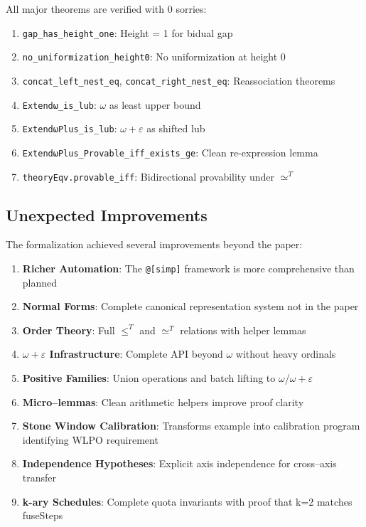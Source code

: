 \documentclass[11pt]{article}
\theoremstyle{definition}
\theoremstyle{remark}
\newcommand{\lean}[1]{\texttt{#1}}
\begin{document}
All major theorems are verified with 0 sorries:
\begin{enumerate}
\item \lean{gap\_has\_height\_one}: Height = 1 for bidual gap
\item \lean{no\_uniformization\_height0}: No uniformization at height 0
\item \lean{concat\_left\_nest\_eq}, \lean{concat\_right\_nest\_eq}: Reassociation theorems
\item \lean{Extendω\_is\_lub}: $\omega$ as least upper bound
\item \lean{ExtendωPlus\_is\_lub}: $\omega+\varepsilon$ as shifted lub
\item \lean{ExtendωPlus\_Provable\_iff\_exists\_ge}: Clean re-expression lemma
\item \lean{theoryEqv.provable\_iff}: Bidirectional provability under $\simeq^T$
\end{enumerate}

\subsection{Unexpected Improvements}

The formalization achieved several improvements beyond the paper:

\begin{enumerate}
\item \textbf{Richer Automation}: The \texttt{@[simp]} framework is more comprehensive than planned
\item \textbf{Normal Forms}: Complete canonical representation system not in the paper
\item \textbf{Order Theory}: Full $\leq^T$ and $\simeq^T$ relations with helper lemmas
\item \textbf{$\omega+\varepsilon$ Infrastructure}: Complete API beyond $\omega$ without heavy ordinals
\item \textbf{Positive Families}: Union operations and batch lifting to $\omega$/$\omega+\varepsilon$
\item \textbf{Micro--lemmas}: Clean arithmetic helpers improve proof clarity
\item \textbf{Stone Window Calibration}: Transforms example into calibration program identifying WLPO requirement
\item \textbf{Independence Hypotheses}: Explicit axis independence for cross--axis transfer
\item \textbf{k-ary Schedules}: Complete quota invariants with proof that k=2 matches fuseSteps
\end{enumerate}
\fi %
\end{document}
